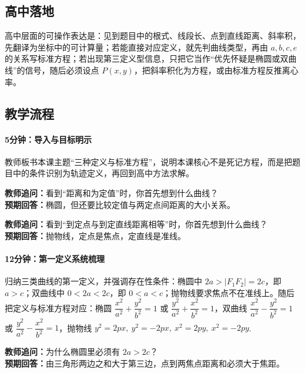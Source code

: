 \documentclass[UTF8,a4paper,11pt]{ctexart}
\begin{document}
\subsection*{高中落地}

高中层面的可操作表达是：见到题目中的根式、线段长、点到直线距离、斜率积，先翻译为坐标中的可计算量；若能直接对应定义，就先判曲线类型，再由 $a,b,c,e$ 的关系写标准方程；若出现第三定义型信息，只把它当作“优先怀疑是椭圆或双曲线”的信号，随后必须设点 $P(x,y)$，把斜率积化为方程，或由标准方程反推离心率。

\subsection*{教学流程}

\paragraph{5分钟：导入与目标明示}

教师板书本课主题“三种定义与标准方程”，说明本课核心不是死记方程，而是把题目中的条件识别为轨迹定义，再回到高中方法求解。

\noindent\textbf{教师追问：}看到“距离和为定值”时，你首先想到什么曲线？\\

\textbf{预期回答：}椭圆，但还要比较定值与两定点间距离的大小关系。\par

\noindent\textbf{教师追问：}看到“到定点与到定直线距离相等”时，你首先想到什么曲线？\\

\textbf{预期回答：}抛物线，定点是焦点，定直线是准线。\par

\paragraph{12分钟：第一定义系统梳理}

归纳三类曲线的第一定义，并强调存在性条件：椭圆中 $2a>|F_1F_2|=2c$，即 $a>c$；双曲线中 $0<2a<2c$，即 $0<a<c$；抛物线要求焦点不在准线上。随后把定义与标准方程对应：椭圆 $\dfrac{x^2}{a^2}+\dfrac{y^2}{b^2}=1$ 或 $\dfrac{y^2}{a^2}+\dfrac{x^2}{b^2}=1$，双曲线 $\dfrac{x^2}{a^2}-\dfrac{y^2}{b^2}=1$ 或 $\dfrac{y^2}{a^2}-\dfrac{x^2}{b^2}=1$，抛物线 $y^2=2px,\ y^2=-2px,\ x^2=2py,\ x^2=-2py$.

\noindent\textbf{教师追问：}为什么椭圆里必须有 $2a>2c$？\\

\textbf{预期回答：}由三角形两边之和大于第三边，点到两焦点距离和必须大于焦距。\par
\end{document}
